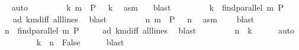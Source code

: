 \begin{isabellebody}
\ {}\ \isamarkupfalse%
\ auto\isanewline
\ \ \ \ \ \ \isamarkupfalse%
\ {}{\isacharcolon}{\kern0pt}\ {\isachardoublequoteopen}k\ {\isacharbar}{\kern0pt}{\isacharbar}{\kern0pt}m\ {\isasymand}\ P\ {\isasymlhd}\ \ k{\isachardoublequoteclose}\ \isamarkupfalse%
\ asm{}\ {}\ \isamarkupfalse%
\ blast\isanewline
\ \ \ \ \ \ \isamarkupfalse%
\ {}{\isacharcolon}{\kern0pt}\ {\isachardoublequoteopen}k\ {\isacharequal}{\kern0pt}\ find{\isacharunderscore}{\kern0pt}parallel\ m\ P{\isachardoublequoteclose}\ \isamarkupfalse%
\ \ {}\ {}\ a{}d\ kmdiff{}\ all{\isacharunderscore}{\kern0pt}lines\ \isamarkupfalse%
\ blast\isanewline
\ \ \ \ \ \ \isamarkupfalse%
\ {}{\isacharcolon}{\kern0pt}\ {\isachardoublequoteopen}n\ {\isacharbar}{\kern0pt}{\isacharbar}{\kern0pt}m\ {\isasymand}\ P\ {\isasymlhd}\ \ n{\isachardoublequoteclose}\ \isamarkupfalse%
\ asm{}\ {}\ \ \isamarkupfalse%
\ blast\isanewline
\ \ \ \ \ \ \isamarkupfalse%
\ {}{}{\isacharcolon}{\kern0pt}\ {\isachardoublequoteopen}n\ {\isacharequal}{\kern0pt}\ find{\isacharunderscore}{\kern0pt}parallel\ m\ P{\isachardoublequoteclose}\ \isamarkupfalse%
\ \ {}\ {}\ a{}d\ kmdiff{}\ all{\isacharunderscore}{\kern0pt}lines\ \isamarkupfalse%
\ blast\isanewline
\ \ \ \ \ \ \isamarkupfalse%
\ {}{}{\isacharcolon}{\kern0pt}\ {\isachardoublequoteopen}n\ {\isacharequal}{\kern0pt}\ k{\isachardoublequoteclose}\ \isamarkupfalse%
\ {}\ {}{}\ \isamarkupfalse%
\ auto\isanewline
\ \ \ \ \ \ \isamarkupfalse%
\ {\isachardoublequoteopen}\ {\isasymnot}\ k\ {\isacharbar}{\kern0pt}{\isacharbar}{\kern0pt}\ n\ {\isasymLongrightarrow}\ False{\isachardoublequoteclose}\ \isamarkupfalse%
\ {}\ {}{}\ \isamarkupfalse%
\ blast\isanewline
\ \ \ \ \isamarkupfalse%
\isanewline
\ \ \isamarkupfalse%
\isanewline
{}\isamarkupfalse%
%
\endisatagproof
{\isafoldproof}%
%
\isadelimproof
\isanewline
%
\endisadelimproof
\isanewline
{}\isamarkupfalse%

\end{isabellebody}
